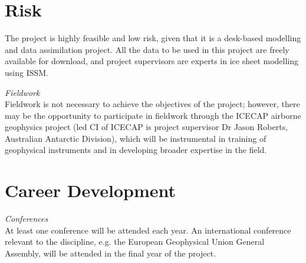 \section*{Risk}

The project is highly feasible and low risk, given that it is a desk-based modelling and data assimilation project. All the data to be used in this project are freely available for download, and project supervisors are experts in ice sheet modelling using ISSM.

\textit{Fieldwork}\\
Fieldwork is not necessary to achieve the objectives of the project; however, there may be the opportunity to participate in fieldwork through the ICECAP airborne geophysics project (led CI of ICECAP is project supervisor Dr Jason Roberts, Australian Antarctic Division), which will be instrumental in training of geophysical instruments and in developing broader expertise in the field. \\

\section*{Career Development}

\textit{Conferences}\\
At least one conference will be attended each year. An international conference relevant to the discipline, e.g. the European Geophysical Union General Assembly, will be attended in the final year of the project.
